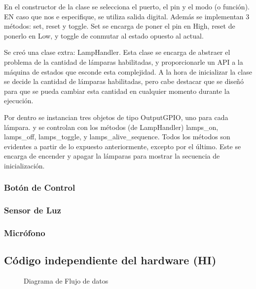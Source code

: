 En el constructor de la clase  se selecciona el puerto, el pin y el modo (o función). EN caso que
nos e especifique, se utiliza salida digital. Además se implementan 3 métodos: set, reset y
toggle. Set se encarga de poner el pin en High, reset de ponerlo en Low, y toggle de conmutar al
estado opuesto al actual.

Se creó una clase extra: LampHandler. Esta clase se encarga de abstraer el problema de la cantidad
de lámparas habilitadas, y proporcionarle un API a la máquina de estados que esconde esta
complejidad. A la hora de inicializar la clase se decide la cantidad de lámparas habilitadas, pero
cabe destacar que se diseñó para que se pueda cambiar esta cantidad en cualquier momento durante la
ejecución.

Por dentro se instancian tres objetos de tipo OutputGPIO, uno para cada lámpara. y se controlan con
los métodos (de LampHandler) lamps\_on, lamps\_off, lamps\_toggle, y lamps\_alive\_sequence. Todos los
métodos son evidentes a partir de lo expuesto anteriormente, excepto por el último. Este se encarga
de encender y apagar la lámparas para mostrar la secuencia de inicialización. 

\subsubsection{Botón de Control}

\subsubsection{Sensor de Luz}
\subsubsection{Micrófono}




\subsection{Código independiente del hardware (HI)}

\begin{figure}
\centering
\scalebox{.5}{}
\caption{Diagrama de Flujo de datos}
\label{fig:data_flow}
\end{figure}


